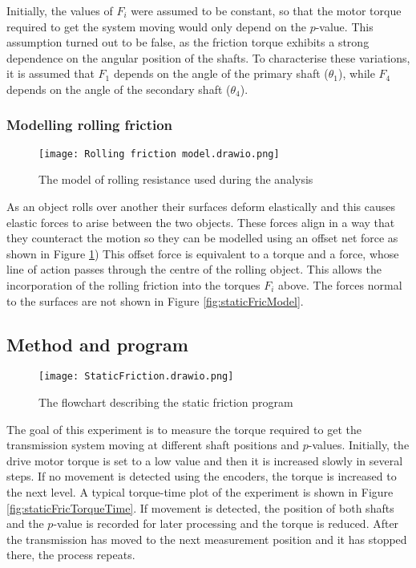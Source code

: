 \documentclass[12pt]{article}
\begin{document}
Initially, the values of $F_i$ were assumed to be constant, so that the motor torque required to get the system moving would only depend on the $p$-value. This assumption turned out to be false, as the friction torque exhibits a strong dependence on the angular position of the shafts. To characterise these variations, it is assumed that $F_1$ depends on the angle of the primary shaft ($\theta_1$), while $F_4$ depends on the angle of the secondary shaft ($\theta_4$).



\subsubsection{Modelling rolling friction}
\label{sec:rollingFric}
\begin{figure}[h]
    \centering
    \texttt{[image: Rolling friction model.drawio.png]}
    \caption{The model of rolling resistance used during the analysis}
    \label{fig:rollingFriction}
\end{figure}


As an object rolls over another their surfaces deform elastically and this causes elastic forces to arise between the two objects. These forces align in a way that they counteract the motion so they can be modelled using an offset net force as shown in Figure \ref{fig:rollingFriction}) This offset force is equivalent to a torque and a force, whose line of action passes through the centre of the rolling object. This allows the incorporation of the rolling friction into the torques $F_i$ above. The forces normal to the surfaces are not shown in Figure \ref{fig:staticFricModel}.   





\subsection{Method and program}

\begin{figure}[h]
    \centering
    \texttt{[image: StaticFriction.drawio.png]}
    \caption{The flowchart describing the static friction program}
    \label{fig:staticFricFlowchart}
\end{figure}

The goal of this experiment is to measure the torque required to get the transmission system moving at different shaft positions and $p$-values. Initially, the drive motor torque is set to a low value and then it is increased slowly in several steps. If no movement is detected using the encoders, the torque is increased to the next level. A typical torque-time plot of the experiment is shown in Figure \ref{fig:staticFricTorqueTime}. If movement is detected, the position of both shafts and the $p$-value is recorded for later processing and the torque is reduced. After the transmission has moved to the next measurement position and it has stopped there, the process repeats.\\
\end{document}

